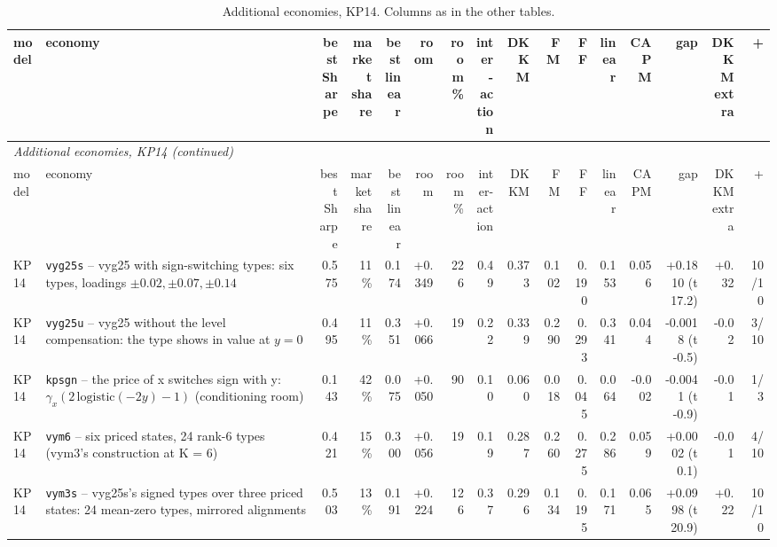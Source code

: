 \begin{landscape}
\begin{longtable}{lp{4.6cm}rrrrrrrrrrrrrr}
\caption{Additional economies, KP14. Columns as in the other tables.}\label{tab:xa-kp14}\\\hline
model & economy & \shortstack[r]{best\\Sharpe} & \shortstack[r]{market\\share} & \shortstack[r]{best\\linear} & room & \shortstack[r]{room\\\%} & \shortstack[r]{inter-\\action} & DKKM & FM & FF & linear & CAPM & gap & \shortstack[r]{DKKM\\extra} & + \\\hline\endfirsthead
\multicolumn{16}{l}{\textit{Additional economies, KP14 (continued)}}\\\hline
model & economy & \shortstack[r]{best\\Sharpe} & \shortstack[r]{market\\share} & \shortstack[r]{best\\linear} & room & \shortstack[r]{room\\\%} & \shortstack[r]{inter-\\action} & DKKM & FM & FF & linear & CAPM & gap & \shortstack[r]{DKKM\\extra} & + \\\hline\endhead
\hline\endfoot
KP14 & \texttt{vyg25s} -- vyg25 with sign-switching types: six types, loadings $\pm 0.02, \pm 0.07, \pm 0.14$ & 0.575 & 11\% & 0.174 & +0.349 & 226 & 0.49 & 0.373 & 0.102 & 0.190 & 0.153 & 0.056 & +0.1810 (t 17.2) & +0.32 & 10/10 \\
KP14 & \texttt{vyg25u} -- vyg25 without the level compensation: the type shows in value at $y = 0$ & 0.495 & 11\% & 0.351 & +0.066 & 19 & 0.22 & 0.339 & 0.290 & 0.293 & 0.341 & 0.044 & -0.0018 (t -0.5) & -0.02 & 3/10 \\
KP14 & \texttt{kpsgn} -- the price of x switches sign with y: $\gamma_x (2\,\mathrm{logistic}(-2y) - 1)$ (conditioning room) & 0.143 & 42\% & 0.075 & +0.050 & 90 & 0.10 & 0.060 & 0.018 & 0.045 & 0.064 & -0.002 & -0.0041 (t -0.9) & -0.01 & 1/3 \\
KP14 & \texttt{vym6} -- six priced states, 24 rank-6 types (vym3's construction at K = 6) & 0.421 & 15\% & 0.300 & +0.056 & 19 & 0.19 & 0.287 & 0.260 & 0.275 & 0.286 & 0.059 & +0.0002 (t 0.1) & -0.01 & 4/10 \\
KP14 & \texttt{vym3s} -- vyg25s's signed types over three priced states: 24 mean-zero types, mirrored alignments & 0.503 & 13\% & 0.191 & +0.224 & 126 & 0.37 & 0.296 & 0.134 & 0.195 & 0.171 & 0.065 & +0.0998 (t 20.9) & +0.22 & 10/10 \\

\end{longtable}
\end{landscape}
